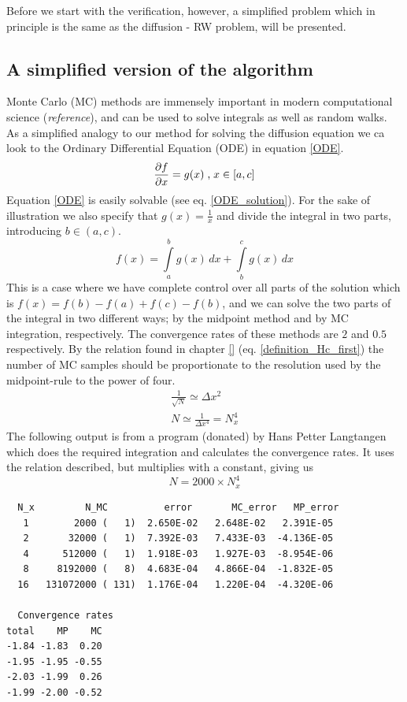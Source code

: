 Before we start with the verification, however, a simplified problem which in principle is the same as the diffusion - RW problem, will be presented.

\subsection{A simplified version of the algorithm}\label{simplified_test}

Monte Carlo (MC) methods are immensely important in modern computational science (\emph{reference}), and can be used to solve integrals as well as random walks. 
As a simplified analogy to our method for solving the diffusion equation we ca look to the Ordinary Differential Equation (ODE) in equation \eqref{ODE}. 
\begin{equation}\label{ODE}
 \frac{\partial f}{\partial x} = g(x)\;\text{,}\; x\in [a,c]
\end{equation}
Equation \eqref{ODE} is easily solvable (see eq. \eqref{ODE_solution}). For the sake of illustration we also specify that $g(x) = \frac{1}{x}$ and divide the integral in two parts, introducing $b\in (a,c)$.
\begin{equation}\label{ODE_solution}
 f(x) = \int\limits_a^b g(x)\,dx + \int\limits_b^c g(x)\,dx
\end{equation}
This is a case where we have complete control over all parts of the solution which is $f(x) = f(b)-f(a) + f(c)-f(b)$, and we can solve the two parts of the integral in two different ways; by the midpoint method and by MC integration, respectively. The convergence rates of these methods are $2$ and $0.5$ respectively. 
By the relation found in chapter \ref{} (eq. \eqref{definition_Hc_first}) the number of MC samples should be proportionate to the resolution used by the midpoint-rule to the power of four. 
\begin{align*}
 \frac{1}{\sqrt{N}} \simeq \Delta x^2 \\
 N \simeq \frac{1}{\Delta x^4} = N_x^4
\end{align*}
The following output is from a program (donated) by Hans Petter Langtangen which does the required integration and calculates the convergence rates. 
It uses the relation described, but multiplies with a constant, giving us 
\begin{equation}\label{num_walkers_MC_integration}
 N = 2000\times N_x^4
\end{equation}
\clearpage
\begin{lstlisting}
  N_x	      N_MC	        error       MC_error   MP_error
   1        2000 (   1)  2.650E-02   2.648E-02   2.391E-05
   2       32000 (   1)  7.392E-03   7.433E-03  -4.136E-05
   4      512000 (   1)  1.918E-03   1.927E-03  -8.954E-06
   8     8192000 (   8)  4.683E-04   4.866E-04  -1.832E-05
  16   131072000 ( 131)  1.176E-04   1.220E-04  -4.320E-06
  
  Convergence rates
total    MP    MC
-1.84 -1.83  0.20
-1.95 -1.95 -0.55
-2.03 -1.99  0.26
-1.99 -2.00 -0.52
\end{lstlisting}
